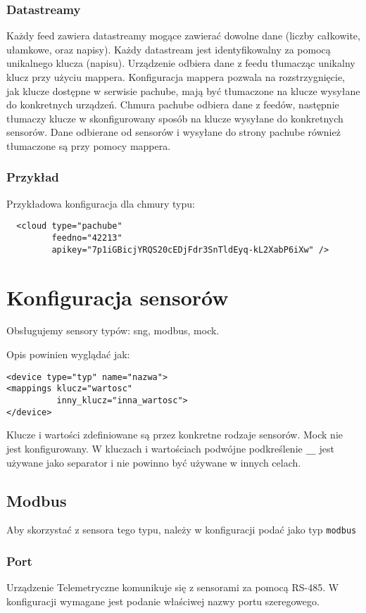 \documentclass[11pt]{article}
\begin{document}
\subsubsection{Datastreamy}
Każdy feed zawiera datastreamy mogące zawierać dowolne dane (liczby całkowite, ułamkowe, oraz napisy). Każdy datastream jest identyfikowalny za pomocą unikalnego klucza (napisu). Urządzenie odbiera dane z feedu tłumacząc unikalny klucz przy użyciu mappera. Konfiguracja mappera pozwala na rozstrzygnięcie, jak klucze dostępne w serwisie pachube, mają być tłumaczone na klucze wysyłane do konkretnych urządzeń. Chmura pachube odbiera dane z feedów, następnie tłumaczy klucze w skonfigurowany sposób na klucze wysyłane do konkretnych sensorów.
Dane odbierane od sensorów i wysyłane do strony pachube również tłumaczone są przy pomocy mappera.

\subsubsection{Przykład}

Przykładowa konfiguracja dla chmury typu:
\begin{verbatim}
  <cloud type="pachube" 
         feedno="42213" 
         apikey="7p1iGBicjYRQS20cEDjFdr3SnTldEyq-kL2XabP6iXw" />
\end{verbatim}




\section{Konfiguracja sensorów}
Obsługujemy sensory typów: sng, modbus, mock.

Opis powinien wyglądać jak:
\begin{verbatim}
<device type="typ" name="nazwa">
<mappings klucz="wartosc"
          inny_klucz="inna_wartosc">
</device>
\end{verbatim}

Klucze i wartości zdefiniowane są przez konkretne rodzaje sensorów. Mock nie jest konfigurowany.
W kluczach i wartościach podwójne podkreślenie \verb|__| jest używane jako separator i nie
powinno być używane w innych celach.


\subsection{Modbus}
Aby skorzystać z sensora tego typu, należy w konfiguracji podać jako typ \verb|modbus|
\subsubsection{Port}
Urządzenie Telemetryczne komunikuje się z sensorami za pomocą RS-485. W konfiguracji wymagane
jest podanie właściwej nazwy portu szeregowego.
\end{document}
